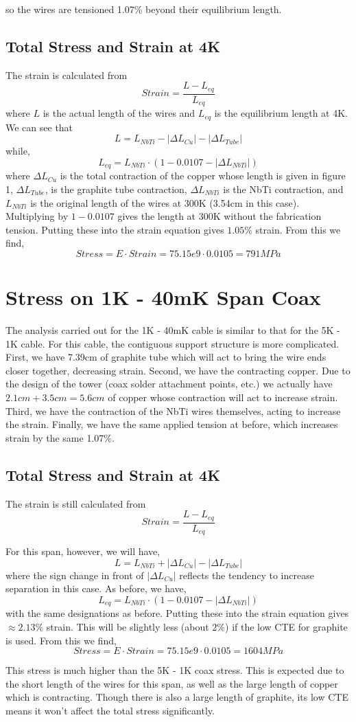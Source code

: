 \documentclass{article}
\begin{document}
so the wires are tensioned 1.07\% beyond their equilibrium length.

\subsection{Total Stress and Strain at 4K}
The strain is calculated from 
$$
Strain = \frac{L - L_{eq}}{L_{eq}}
$$
where $L$ is the actual length of the wires and $L_{eq}$ is the equilibrium length at 4K. We can see that 
$$ 
L = L_{NbTi} - |\Delta L_{Cu}| - |\Delta L_{Tube}|
$$
while,
$$
L_{eq} = L_{NbTi} \cdot (1 - 0.0107 - |\Delta L_{NbTi}|)
$$ 
where $\Delta L_{Cu}$ is the total contraction of the copper whose length is given in figure 1, $\Delta L_{Tube}$, is the graphite tube contraction, $\Delta L_{NbTi}$ is the NbTi contraction, and $L_{NbTi}$ is the original length of the wires at 300K (3.54cm in this case). Multiplying by $1 - 0.0107$ gives the length at 300K without the fabrication tension. Putting these into the strain equation gives $1.05 \%$ strain. From this we find,
$$
Stress = E \cdot Strain = 75.15e9 \cdot 0.0105 = 791MPa
$$

\section{Stress on 1K - 40mK Span Coax}

The analysis carried out for the 1K - 40mK cable is similar to that for the 5K - 1K cable. For this cable, the contiguous support structure is more complicated. First, we have 7.39cm of graphite tube which will act to bring the wire ends closer together, decreasing strain. Second, we have the contracting copper. Due to the design of the tower (coax solder attachment points, etc.) we actually have $2.1cm + 3.5cm = 5.6cm$ of copper whose contraction will act to increase strain. Third, we have the contraction of the NbTi wires themselves, acting to increase the strain. Finally, we have the same applied tension at before, which increases strain by the same 1.07\%.

\subsection{Total Stress and Strain at 4K}
The strain is still calculated from
$$
Strain = \frac{L - L_{eq}}{L_{eq}}
$$

For this span, however, we will have,
$$
L = L_{NbTi} + |\Delta L_{Cu}| - |\Delta L_{Tube}|
$$
where the sign change in front of $|\Delta L_{Cu}|$ reflects the tendency to increase separation in this case. As before, we have,
$$
L_{eq} = L_{NbTi} \cdot (1 - 0.0107 - |\Delta L_{NbTi}|)
$$
with the same designations as before. Putting these into the strain equation gives $\approx 2.13 \%$ strain. This will be slightly less (about $2\%$) if the low CTE for graphite is used. From this we find,
$$
Stress = E \cdot Strain = 75.15e9 \cdot 0.0105 = 1604MPa
$$

This stress is much higher than the 5K - 1K coax stress. This is expected due to the short length of the wires for this span, as well as the large length of copper which is contracting. Though there is also a large length of graphite, its low CTE means it won't affect the total stress significantly.
\end{document}
